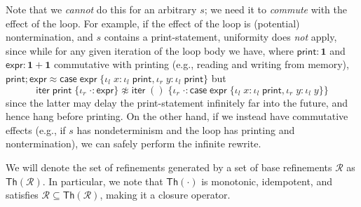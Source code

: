 \documentclass[acmsmall,screen,review]{acmart}
\newcommand{\mc}[1]{\ensuremath{\mathcal{#1}}}
\newcommand{\mb}[1]{\ensuremath{\mathbf{#1}}}
\newcommand{\ms}[1]{\ensuremath{\mathsf{#1}}}
\newcommand{\lto}{:}
\newcommand{\linl}[1]{\iota_l\;{#1}}
\newcommand{\linr}[1]{\iota_r\;{#1}}
\newcommand{\caseexpr}[5]{\ms{case}\;#1\;\{\linl{#2} \lto #3, \linr{#4} \lto #5\}}
\newcommand{\liter}[3]{\ms{iter}\;#1\;\{ \linr{#2} \lto #3 \}}
\begin{document}
Note that we \emph{cannot} do this for an arbitrary $s$; we need it to \emph{commute} with the
effect of the loop. For example, if the effect of the loop is (potential) nontermination, and $s$
contains a print-statement, uniformity does \emph{not} apply, since while for any given iteration of
the loop body we have, where $\ms{print}: \mb{1}$ and $\ms{expr}: \mb{1} + \mb{1}$ commutative with
printing (e.g., reading and writing from memory),
$
\ms{print} ; \ms{expr} \approx
\caseexpr{\ms{expr}}
  {x}{{\linl{\ms{print}}}}
  {y}{{\linl{\ms{print}}}}
$
but
$$
\liter{\ms{print}}{\cdot}{\ms{expr}} \not\approx
\liter{()}{\cdot}{\caseexpr{\ms{expr}}
  {x}{\linl{\ms{print}}}{y}{\linl{y}}}
$$
since the latter may delay the print-statement infinitely far into the future, and hence hang before
printing. On the other hand, if we instead have commutative effects (e.g., if $s$ has nondeterminism
and the loop has printing and nontermination), we can safely perform the infinite rewrite.

We will denote the set of refinements generated by a set of base refinements $\mc{R}$ as
$\ms{Th}(\mc{R})$. In particular, we note that $\ms{Th}(\cdot)$ is monotonic, idempotent, and
satisfies $\mc{R} \subseteq \ms{Th}(\mc{R})$, making it a closure operator.
\end{document}
